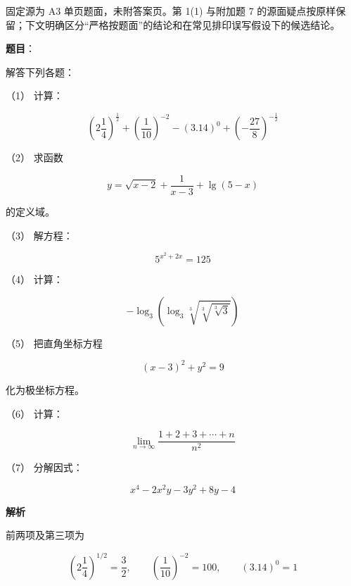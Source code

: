 

\begin{gktip}
固定源为 A3 单页题面，未附答案页。第 1(1) 与附加题 7 的源面疑点按原样保留；下文明确区分“严格按题面”的结论和在常见排印误写假设下的候选结论。
\end{gktip}

\begin{answer}

\textbf{题目}：

解答下列各题：

（1） 计算：

\nopagebreak[4]
\[
\left(2\frac14\right)^{\frac12}+\left(\frac1{10}\right)^{-2}-(3.14)^0+\left(-\frac{27}{8}\right)^{-\frac12}
\]

（2） 求函数

\nopagebreak[4]
\[
y=\sqrt{x-2}+\frac1{x-3}+\lg(5-x)
\]

的定义域。

（3） 解方程：

\nopagebreak[4]
\[
5^{x^2+2x}=125
\]

（4） 计算：

\nopagebreak[4]
\[
-\log_3\left(\log_3\sqrt[3]{\sqrt[3]{\sqrt[3]{3}}}\right)
\]

（5） 把直角坐标方程

\nopagebreak[4]
\[
(x-3)^2+y^2=9
\]

化为极坐标方程。

（6） 计算：

\nopagebreak[4]
\[
\lim_{n\to\infty}\frac{1+2+3+\cdots+n}{n^2}
\]

（7） 分解因式：

\nopagebreak[4]
\[
x^4-2x^2y-3y^2+8y-4
\]

\textbf{解析}


前两项及第三项为

\nopagebreak[4]
\[
\left(2\frac14\right)^{1/2}=\frac32,
\qquad
\left(\frac1{10}\right)^{-2}=100,
\qquad
(3.14)^0=1
\]


\end{answer}
